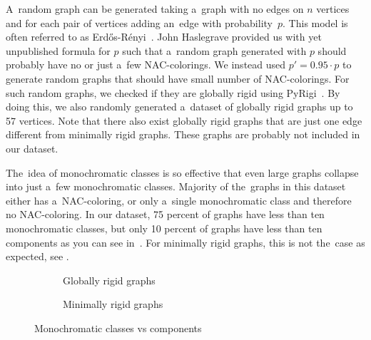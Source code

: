 A~random graph can be generated taking a~graph with no edges on \( n \) vertices
and for each pair of vertices adding an~edge with probability~\( p \).
This model is often referred to as Erdős-Rényi~\cite{random_gnp}.
%
John Haslegrave provided us with yet unpublished formula for \( p \)
such that a~random graph generated with \( p \)
should probably have no or just a~few NAC-colorings.
%
We instead used \( p' = 0.95\cdot p \) to generate random graphs that
should have small number of NAC-colorings.
For such random graphs, we checked if they are globally rigid using PyRigi~\cite{pyrigi}.
%
By doing this, we also randomly generated a~dataset of globally rigid graphs
up to 57 vertices.
%
Note that there also exist globally rigid graphs
that are just one edge different from minimally rigid graphs.
These graphs are probably not included in our dataset.

The~idea of monochromatic classes is so effective
that even large graphs collapse into just a~few monochromatic classes.
Majority of the~graphs in this dataset either has a~NAC-coloring,
or only a~single monochromatic class and therefore no NAC-coloring.
In our dataset, 75 percent of graphs have less than ten	monochromatic classes,
but only 10 percent of graphs have less than ten \trcon{} components
as you can see in~.
For minimally rigid graphs, this is not the~case as expected, see
.
%
\begin{figure}[h!]
	\centering
	\begin{subfigure}{0.48\textwidth}
		\centering
		\scalebox{0.6}{}
		\caption[Monoch. classes vs tr. con. components for globally rigid]{%
			\centering Globally rigid graphs}%
		\label{fig:monochrom_vs_triangle_globally_rigid}
	\end{subfigure}
	\hfill
	\begin{subfigure}{0.48\textwidth}
		\centering
		\scalebox{0.6}{}
		\caption[Monoch. classes vs tr. con. components for minimally rigid]{%
			\centering Minimally rigid graphs}%
		\label{fig:monochrom_vs_triangle_minimally_rigid}
	\end{subfigure}
	\caption{Monochromatic classes vs \trcon{} components}%
	\label{fig:monochrom_vs_triangle}
\end{figure}

